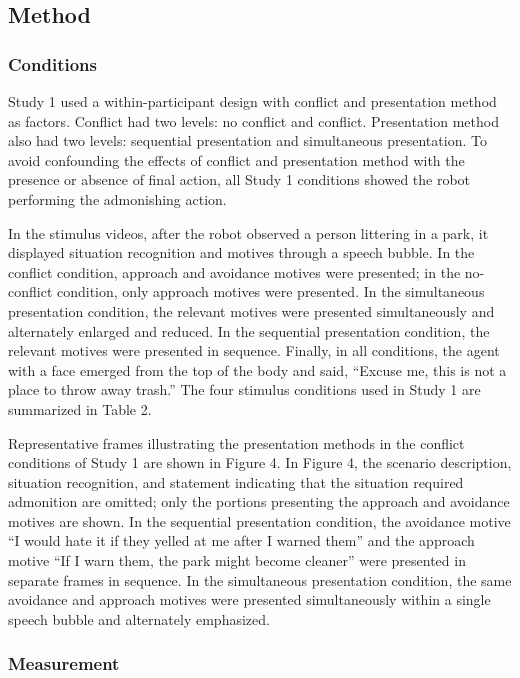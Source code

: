 \documentclass[utf8]{FrontiersinHarvard}
\begin{document}
\subsection{Method}\label{method}

\subsubsection{Conditions}\label{conditions}

Study 1 used a within-participant design with conflict and presentation method as factors. Conflict had two levels: no conflict and conflict. Presentation method also had two levels: sequential presentation and simultaneous presentation. To avoid confounding the effects of conflict and presentation method with the presence or absence of final action, all Study 1 conditions showed the robot performing the admonishing action.

In the stimulus videos, after the robot observed a person littering in a park, it displayed situation recognition and motives through a speech bubble. In the conflict condition, approach and avoidance motives were presented; in the no-conflict condition, only approach motives were presented. In the simultaneous presentation condition, the relevant motives were presented simultaneously and alternately enlarged and reduced. In the sequential presentation condition, the relevant motives were presented in sequence. Finally, in all conditions, the agent with a face emerged from the top of the body and said, ``Excuse me, this is not a place to throw away trash.'' The four stimulus conditions used in Study 1 are summarized in Table 2.

Representative frames illustrating the presentation methods in the conflict conditions of Study 1 are shown in Figure 4. In Figure 4, the scenario description, situation recognition, and statement indicating that the situation required admonition are omitted; only the portions presenting the approach and avoidance motives are shown. In the sequential presentation condition, the avoidance motive ``I would hate it if they yelled at me after I warned them'' and the approach motive ``If I warn them, the park might become cleaner'' were presented in separate frames in sequence. In the simultaneous presentation condition, the same avoidance and approach motives were presented simultaneously within a single speech bubble and alternately emphasized.

\subsubsection{Measurement}\label{measurement}
\end{document}
